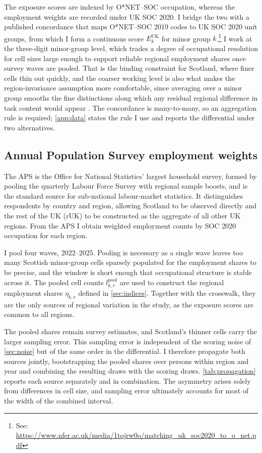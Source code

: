 The exposure scores are indexed by O*NET--SOC occupation, whereas the employment weights are recorded under UK SOC 2020. I bridge the two with a published concordance that maps O*NET--SOC 2019 codes to UK SOC 2020 unit groups, from which I form a continuous score $E^{\mathrm{UK}}_k$ for minor group $k$.\footnote{See: \url{https://www.nfer.ac.uk/media/1tojrw0o/matching_uk_soc2020_to_o_net.pdf}} I work at the three-digit minor-group level, which trades a degree of occupational resolution for cell sizes large enough to support reliable regional employment shares once survey waves are pooled. That is the binding constraint for Scotland, where finer cells thin out quickly, and the coarser working level is also what makes the region-invariance assumption more comfortable, since averaging over a minor group smooths the fine distinctions along which any residual regional difference in task content would appear \citep{autor2013}. The concordance is many-to-many, so an aggregation rule is required; \cref{app:data} states the rule I use and reports the differential under two alternatives.

\subsection{Annual Population Survey employment weights}\label{sec:aps}

The APS is the Office for National Statistics' largest household survey, formed by pooling the quarterly Labour Force Survey with regional sample boosts, and is the standard source for sub-national labour-market statistics. It distinguishes respondents by country and region, allowing Scotland to be observed directly and the rest of the UK (rUK) to be constructed as the aggregate of all other UK regions. From the APS I obtain weighted employment counts by SOC 2020 occupation for each region.

I pool four waves, 2022--2025. Pooling is necessary as a single wave leaves too many Scottish minor-group cells sparsely populated for the employment shares to be precise, and the window is short enough that occupational structure is stable across it. The pooled cell counts $l^{\mathrm{pool}}_{k,r}$ are used to construct the regional employment shares $\eta_{k,r}$ defined in \cref{sec:indices}. Together with the crosswalk, they are the only sources of regional variation in the study, as the exposure scores are common to all regions.

The pooled shares remain survey estimates, and Scotland's thinner cells carry the larger sampling error. This sampling error is independent of the scoring noise of \cref{sec:noise} but of the same order in the differential. I therefore propagate both sources jointly, bootstrapping the pooled shares over persons within region and year and combining the resulting draws with the scoring draws. \cref{tab:propagation} reports each source separately and in combination. The asymmetry arises solely from differences in cell size, and sampling error ultimately accounts for most of the width of the combined interval.

